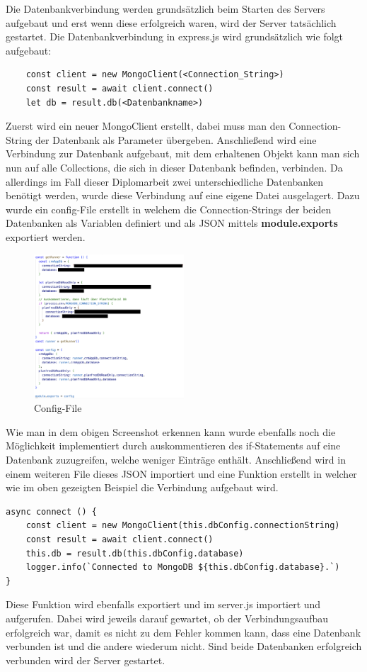Die Datenbankverbindung werden grundsätzlich beim Starten des Servers aufgebaut und erst wenn diese erfolgreich waren, wird der Server tatsächlich gestartet. Die Datenbankverbindung in express.js wird grundsätzlich wie folgt aufgebaut:
\newline
\begin{lstlisting}
    const client = new MongoClient(<Connection_String>)
    const result = await client.connect()
    let db = result.db(<Datenbankname>)
\end{lstlisting}
Zuerst wird ein neuer MongoClient erstellt, dabei muss man den Connection-String der Datenbank als Parameter übergeben. Anschließend wird eine Verbindung zur Datenbank aufgebaut, mit dem erhaltenen Objekt kann man sich nun auf alle Collections, die sich in dieser Datenbank befinden, verbinden. Da allerdings im Fall dieser Diplomarbeit zwei unterschiedliche Datenbanken benötigt werden, wurde diese Verbindung auf eine eigene Datei ausgelagert.
\newline
Dazu wurde ein config-File erstellt in welchem die Connection-Strings der beiden Datenbanken als Variablen definiert und als JSON mittels \textbf{module.exports} exportiert werden.
\begin{figure}[h!]
    \centering
    \includegraphics[width=0.5\textwidth]{pics/config-file-conn-strings.png}
    \caption{Config-File}
    \label{fig:enter-label}
\end{figure}
Wie man in dem obigen Screenshot erkennen kann wurde ebenfalls noch die Möglichkeit implementiert durch auskommentieren des if-Statements auf eine Datenbank zuzugreifen, welche weniger Einträge enthält.
\newline
Anschließend wird in einem weiteren File dieses JSON importiert und eine Funktion erstellt in welcher wie im oben gezeigten Beispiel die Verbindung aufgebaut wird.
\begin{lstlisting}
async connect () {
    const client = new MongoClient(this.dbConfig.connectionString)
    const result = await client.connect()
    this.db = result.db(this.dbConfig.database)
    logger.info(`Connected to MongoDB ${this.dbConfig.database}.`)
}
\end{lstlisting}
Diese Funktion wird ebenfalls exportiert und im server.js importiert und aufgerufen. Dabei wird jeweils darauf gewartet, ob der Verbindungsaufbau erfolgreich war, damit es nicht zu dem Fehler kommen kann, dass eine Datenbank verbunden ist und die andere wiederum nicht. Sind beide Datenbanken erfolgreich verbunden wird der Server gestartet.